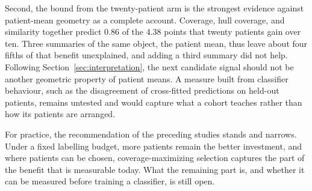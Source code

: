 Second, the bound from the twenty-patient arm is the strongest evidence against patient-mean geometry as a complete account. Coverage, hull coverage, and similarity together predict 0.86 of the 4.38 points that twenty patients gain over ten. Three summaries of the same object, the patient mean, thus leave about four fifths of that benefit unexplained, and adding a third summary did not help. Following Section~\ref{sec:interpretation}, the next candidate signal should not be another geometric property of patient means. A measure built from classifier behaviour, such as the disagreement of cross-fitted predictions on held-out patients, remains untested and would capture what a cohort teaches rather than how its patients are arranged.

For practice, the recommendation of the preceding studies stands and narrows. Under a fixed labelling budget, more patients remain the better investment, and where patients can be chosen, coverage-maximizing selection captures the part of the benefit that is measurable today. What the remaining part is, and whether it can be measured before training a classifier, is still open.

